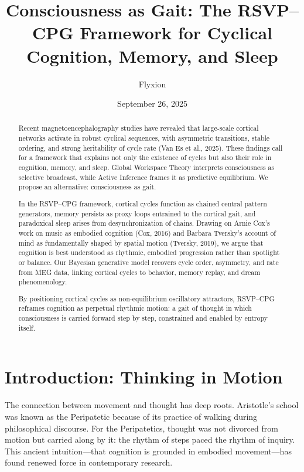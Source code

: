 \documentclass{article}
\title{Consciousness as Gait: The RSVP--CPG Framework for Cyclical Cognition, Memory, and Sleep}
\author{Flyxion}
\date{September 26, 2025}
\begin{document}
\maketitle


\begin{abstract}
Recent magnetoencephalography studies have revealed that large-scale cortical networks activate in robust cyclical sequences, with asymmetric transitions, stable ordering, and strong heritability of cycle rate (Van Es et al., 2025). These findings call for a framework that explains not only the existence of cycles but also their role in cognition, memory, and sleep. Global Workspace Theory interprets consciousness as selective broadcast, while Active Inference frames it as predictive equilibrium. We propose an alternative: consciousness as gait.

In the RSVP--CPG framework, cortical cycles function as chained central pattern generators, memory persists as proxy loops entrained to the cortical gait, and paradoxical sleep arises from desynchronization of chains. Drawing on Arnie Cox’s work on music as embodied cognition (Cox, 2016) and Barbara Tversky’s account of mind as fundamentally shaped by spatial motion (Tversky, 2019), we argue that cognition is best understood as rhythmic, embodied progression rather than spotlight or balance. Our Bayesian generative model recovers cycle order, asymmetry, and rate from MEG data, linking cortical cycles to behavior, memory replay, and dream phenomenology.

By positioning cortical cycles as non-equilibrium oscillatory attractors, RSVP--CPG reframes cognition as perpetual rhythmic motion: a gait of thought in which consciousness is carried forward step by step, constrained and enabled by entropy itself.
\end{abstract}


\tableofcontents

\section{Introduction: Thinking in Motion}

The connection between movement and thought has deep roots. Aristotle’s school was known as the Peripatetic because of its practice of walking during philosophical discourse. For the Peripatetics, thought was not divorced from motion but carried along by it: the rhythm of steps paced the rhythm of inquiry. This ancient intuition—that cognition is grounded in embodied movement—has found renewed force in contemporary research.
\end{document}
